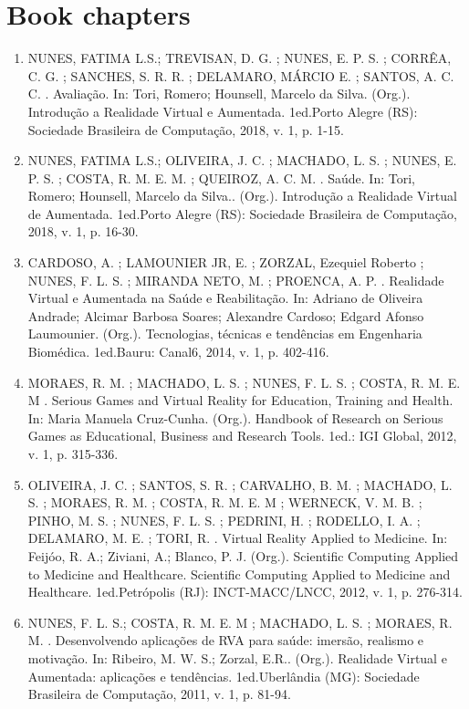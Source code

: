\documentclass[11pt,a4paper,sans]{moderncv} %
\begin{document}
\section{Book chapters}
\footnotesize
\begin{enumerate}
    \item NUNES, FATIMA L.S.; TREVISAN, D. G. ; NUNES, E. P. S. ; CORRÊA, C. G. ; SANCHES, S. R. R. ; DELAMARO, MÁRCIO E. ; SANTOS, A. C. C. . Avaliação. In: Tori, Romero; Hounsell, Marcelo da Silva. (Org.). Introdução a Realidade Virtual e Aumentada. 1ed.Porto Alegre (RS): Sociedade Brasileira de Computação, 2018, v. 1, p. 1-15.
    \item NUNES, FATIMA L.S.; OLIVEIRA, J. C. ; MACHADO, L. S. ; NUNES, E. P. S. ; COSTA, R. M. E. M. ; QUEIROZ, A. C. M. . Saúde. In: Tori, Romero; Hounsell, Marcelo da Silva.. (Org.). Introdução a Realidade Virtual de Aumentada. 1ed.Porto Alegre (RS): Sociedade Brasileira de Computação, 2018, v. 1, p. 16-30.
    \item CARDOSO, A. ; LAMOUNIER JR, E. ; ZORZAL, Ezequiel Roberto ; NUNES, F. L. S. ; MIRANDA NETO, M. ; PROENCA, A. P. . Realidade Virtual e Aumentada na Saúde e Reabilitação. In: Adriano de Oliveira Andrade; Alcimar Barbosa Soares; Alexandre Cardoso; Edgard Afonso Laumounier. (Org.). Tecnologias, técnicas e tendências em Engenharia Biomédica. 1ed.Bauru: Canal6, 2014, v. 1, p. 402-416.
    \item MORAES, R. M. ; MACHADO, L. S. ; NUNES, F. L. S. ; COSTA, R. M. E. M . Serious Games and Virtual Reality for Education, Training and Health. In: Maria Manuela Cruz-Cunha. (Org.). Handbook of Research on Serious Games as Educational, Business and Research Tools. 1ed.: IGI Global, 2012, v. 1, p. 315-336.
    \item OLIVEIRA, J. C. ; SANTOS, S. R. ; CARVALHO, B. M. ; MACHADO, L. S. ; MORAES, R. M. ; COSTA, R. M. E. M ; WERNECK, V. M. B. ; PINHO, M. S. ; NUNES, F. L. S. ; PEDRINI, H. ; RODELLO, I. A. ; DELAMARO, M. E. ; TORI, R. . Virtual Reality Applied to Medicine. In: Feijóo, R. A.; Ziviani, A.; Blanco, P. J. (Org.). Scientific Computing Applied to Medicine and Healthcare. Scientific Computing Applied to Medicine and Healthcare. 1ed.Petrópolis (RJ): INCT-MACC/LNCC, 2012, v. 1, p. 276-314.
    \item NUNES, F. L. S.; COSTA, R. M. E. M ; MACHADO, L. S. ; MORAES, R. M. . Desenvolvendo aplicações de RVA para saúde: imersão, realismo e motivação. In: Ribeiro, M. W. S.; Zorzal, E.R.. (Org.). Realidade Virtual e Aumentada: aplicações e tendências. 1ed.Uberlândia (MG): Sociedade Brasileira de Computação, 2011, v. 1, p. 81-94.

\end{enumerate}
\end{document}
